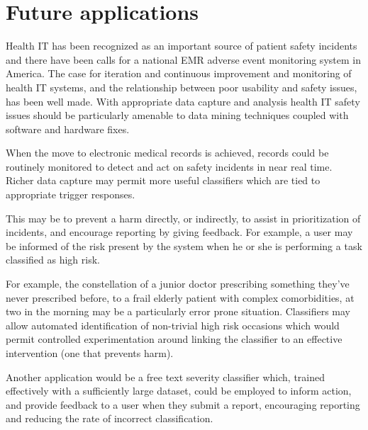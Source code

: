 \section{Future applications}
Health IT has been recognized as an important source of patient safety incidents and there have been calls for a national EMR adverse event monitoring system in America.\cite{Sittig2010} The case for iteration and continuous improvement and monitoring of health IT systems, and the relationship between poor usability and safety issues, has been well made. \cite{Walker2008}\cite{Huckvale2010}\cite{Johnson2006}\cite{Caldwell2011} With appropriate data capture and analysis health IT safety issues should be particularly amenable to data mining techniques coupled with software and hardware fixes.

When the move to electronic medical records is achieved, records could be routinely monitored to detect and act on safety incidents in near real time.\cite{Bates2003} Richer data capture may permit more useful classifiers which are tied to appropriate trigger responses.\cite{Govindan2010}\cite{Singal2012}

This may be to prevent a harm directly, or indirectly, to assist in prioritization of incidents, and encourage reporting by giving feedback. For example, a user may be informed of the risk present by the system when he or she is performing a task classified as high risk. 

For example, the constellation of a junior doctor prescribing something they've never prescribed before, to a frail elderly patient with complex comorbidities, at two in the morning may be a particularly error prone situation. Classifiers may allow automated identification of non-trivial high risk occasions which would permit controlled experimentation around linking the classifier to an effective intervention (one that prevents harm).

Another application would be a free text severity classifier which, trained effectively with a sufficiently large dataset, could be employed to inform action, and provide feedback to a user when they submit a report, encouraging reporting and reducing the rate of incorrect classification.\cite{Pronovost2011} \cite{Cassidy2011}\cite{Ong2012}\cite{Shojania2008}\cite{Ong2012}


